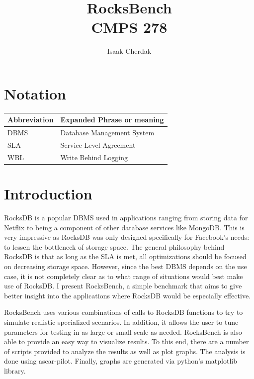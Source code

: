 \documentclass[twocolumn,11pt]{article}
\title{RocksBench\\CMPS 278}
\author{Isaak Cherdak}
\begin{document}
\maketitle

\pagebreak

\section*{Notation}

\begin{center}
  \begin{tabular}{ | l | l | }
    \hline
    Abbreviation & Expanded Phrase or meaning\\ \hline \hline
    DBMS & Database Management System\\ \hline
    SLA & Service Level Agreement\\ \hline
    WBL & Write Behind Logging \\ \hline
  \end{tabular}
\end{center}

\section{Introduction}
\label{sec:overview}

RocksDB\cite{rocksdb} is a popular DBMS used in applications ranging from
storing data for Netflix to being a component of other database services like
MongoDB. This is very impressive as RocksDB was only designed specifically for
Facebook's needs: to lessen the bottleneck of storage space. The general
philosophy behind RocksDB is that as long as the SLA is met, all optimizations
should be focused on decreasing storage space. However, since the best DBMS
depends on the use case\cite{278:lecture}, it is not completely clear as to what
range of situations would best make use of RocksDB. I present RocksBench, a
simple benchmark that aims to give better insight into the applications where
RocksDB would be especially effective.

RocksBench uses various combinations of calls to RocksDB functions to try to
simulate realistic specialized scenarios. In addition, it allows the user to
tune parameters for testing in as large or small scale as needed. RocksBench
is also able to provide an easy way to visualize results. To this end, there are
a number of scripts provided to analyze the results as well as plot graphs. The
analysis is done using ascar-pilot\cite{li:pilot}. Finally, graphs are generated
via python's matplotlib library.
\end{document}
